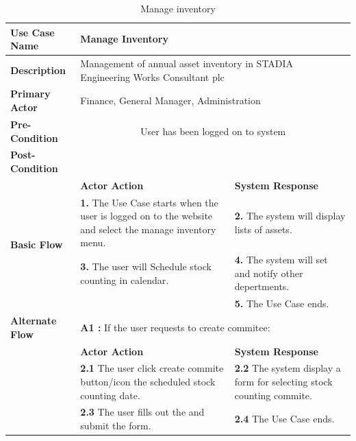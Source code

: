 \begin{table}[!h]
\begin{tabular}{|l|p{6cm}|p{6cm}|}
\hline 
\rule[-1ex]{0pt}{2.5ex} \textbf{Use Case Name} & \multicolumn{2}{p{10cm}|}{Manage Inventory} \\ 
\hline 
\rule[-1ex]{0pt}{2.5ex} \textbf{Description} &\multicolumn{2}{p{10cm}|}{Management of annual asset inventory in STADIA Engineering Works Consultant plc} \\ 
\hline 
\rule[-1ex]{0pt}{2.5ex} \textbf{Primary Actor}& \multicolumn{2}{p{10cm}|}{Finance, General 
Manager, Administration} \\ 
\hline 
\rule[-1ex]{0pt}{2.5ex} \textbf{Pre-Condition} & \multicolumn{2}{c|}{User has been logged on to system} \\ 
\hline 
\rule[-1ex]{0pt}{2.5ex} \textbf{Post-Condition} & \multicolumn{2}{p{10cm}|}{}  \\ 
\hline 
\multirow{4}{*}{\textbf{Basic Flow}} & \textbf{Actor Action} & \textbf{System Response}\\
\cline{2-3}
%
&
\textbf{1.}  The Use Case starts when the user is logged on to the website and select the manage inventory menu.
& 
\textbf{2.}  The system will display lists of assets.
\\
%
&
\textbf{3.}  The user will Schedule stock counting in calendar.
& 
\textbf{4.}  The system will set and notify other depertments. 
\\
%
&

& 
\textbf{5.}  The Use Case ends. 
\\
\hline 
\rule[-1ex]{0pt}{2.5ex} \textbf{Alternate Flow} & \multicolumn{2}{p{10cm}|}{\textbf{A1 : } If the user requests to create commitee:}  \\ 
\cline{2-3}
\multirow{2}{*}{} & \textbf{Actor Action} & \textbf{System Response}\\
\cline{2-3}
%
&
\textbf{2.1}  The user click create commite button/icon the scheduled stock counting date. 
& 
\textbf{2.2}  The system display a form for selecting stock counting commite. 
\\
%
&
\textbf{2.3}  The user fills out the and submit the form. 
& 
\textbf{2.4}  The Use Case ends.  
\\
\hline
\end{tabular}
\caption{Manage inventory} 
\end{table}

